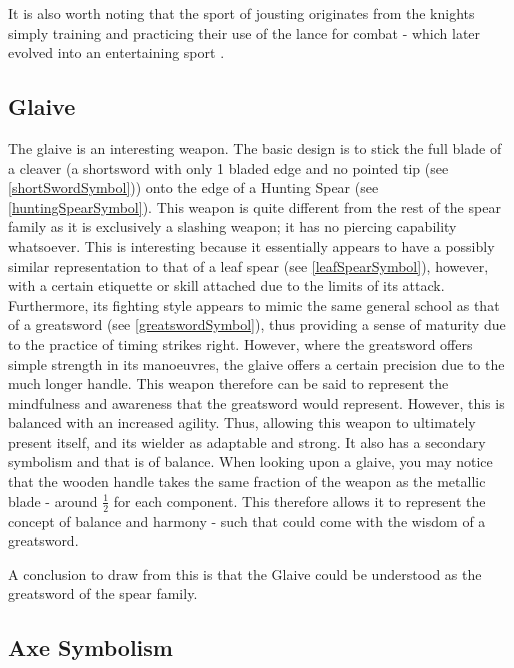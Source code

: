 \documentclass{article}
\begin{document}
It is also worth noting that the sport of jousting originates from the knights simply training and practicing their use of the lance for combat - which later evolved into an entertaining sport \parencite{smith2017lance}. 

\subsection*{Glaive}
The glaive is an interesting weapon. The basic design is to stick the full blade of a cleaver (a shortsword with only 1 bladed edge and no pointed tip (see \ref{shortSwordSymbol})) onto the edge of a Hunting Spear (see \ref{huntingSpearSymbol}). This weapon is quite different from the rest of the spear family as it is exclusively a slashing weapon; it has no piercing capability whatsoever. This is interesting because it essentially appears to have a possibly similar representation to that of a leaf spear (see \ref{leafSpearSymbol}), however, with a certain etiquette or skill attached due to the limits of its attack. Furthermore, its fighting style appears to mimic the same general school as that of a greatsword (see \ref{greatswordSymbol}), thus providing a sense of maturity due to the practice of timing strikes right. However, where the greatsword offers simple strength in its manoeuvres, the glaive offers a certain precision due to the much longer handle. This weapon therefore can be said to represent the mindfulness and awareness that the greatsword would represent. However, this is balanced with an increased agility. Thus, allowing this weapon to ultimately present itself, and its wielder as adaptable and strong. It also has a secondary symbolism and that is of balance. When looking upon a glaive, you may notice that the wooden handle takes the same fraction of the weapon as the metallic blade - around \(\frac{1}{2}\) for each component. This therefore allows it to represent the concept of balance and harmony - such that could come with the wisdom of a greatsword.

A conclusion to draw from this is that the Glaive could be understood as the greatsword of the spear family.

\subsection{Axe Symbolism} \label{axeSymbol}
\pagebreak


\printbibliography
\end{document}
